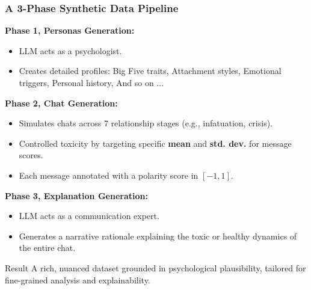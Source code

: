 \documentclass[aspectratio=169]{beamer}
\begin{document}
\begin{frame}
    \frametitle{A 3-Phase Synthetic Data Pipeline}
    \textbf{Phase 1, Personas Generation:}
    \begin{itemize}
        \item LLM acts as a psychologist.
        \item Creates detailed profiles: Big Five traits, Attachment styles, Emotional triggers, Personal history, And so on ...
    \end{itemize}
    \pause
    \textbf{Phase 2, Chat Generation:}
    \begin{itemize}
        \item Simulates chats across 7 relationship stages (e.g., infatuation, crisis).
        \item Controlled toxicity by targeting specific \textbf{mean} and \textbf{std. dev.} for message scores.
        \item Each message annotated with a polarity score in $[-1, 1]$.
    \end{itemize}
    \pause
    \textbf{Phase 3, Explanation Generation:}
    \begin{itemize}
        \item LLM acts as a communication expert.
        \item Generates a narrative rationale explaining the toxic or healthy dynamics of the entire chat.
    \end{itemize}

    \pause
    \begin{alertblock}{Result}
        A rich, nuanced dataset grounded in psychological plausibility, tailored for fine-grained analysis and explainability.
    \end{alertblock}
\end{frame}
\end{document}
